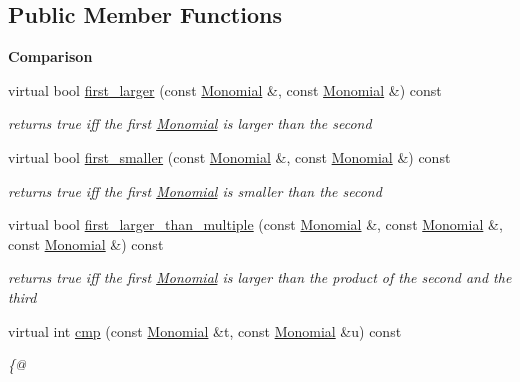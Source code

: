 \subsection*{Public Member Functions}
\begin{Indent}\textbf{ Comparison}\par
\begin{DoxyCompactItemize}
\item 
\mbox{\label{class_generic___grevlex_ab34a4b1def40fd943db4293ddf09c7c5}} 
virtual bool \hyperlink{class_generic___grevlex_ab34a4b1def40fd943db4293ddf09c7c5}{first\+\_\+larger} (const \hyperlink{class_monomial}{Monomial} \&, const \hyperlink{class_monomial}{Monomial} \&) const
\begin{DoxyCompactList}\small\item\em returns {\ttfamily true} iff the first \hyperlink{class_monomial}{Monomial} is larger than the second \end{DoxyCompactList}\item 
\mbox{\label{class_generic___grevlex_a66a1f09fffbdb319fd130941880c7848}} 
virtual bool \hyperlink{class_generic___grevlex_a66a1f09fffbdb319fd130941880c7848}{first\+\_\+smaller} (const \hyperlink{class_monomial}{Monomial} \&, const \hyperlink{class_monomial}{Monomial} \&) const
\begin{DoxyCompactList}\small\item\em returns {\ttfamily true} iff the first \hyperlink{class_monomial}{Monomial} is smaller than the second \end{DoxyCompactList}\item 
\mbox{\label{class_generic___grevlex_a93cb33a7a2f73152ec1e01d155ad14c9}} 
virtual bool \hyperlink{class_generic___grevlex_a93cb33a7a2f73152ec1e01d155ad14c9}{first\+\_\+larger\+\_\+than\+\_\+multiple} (const \hyperlink{class_monomial}{Monomial} \&, const \hyperlink{class_monomial}{Monomial} \&, const \hyperlink{class_monomial}{Monomial} \&) const
\begin{DoxyCompactList}\small\item\em returns {\ttfamily true} iff the first \hyperlink{class_monomial}{Monomial} is larger than the product of the second and the third \end{DoxyCompactList}\item 
virtual int \hyperlink{class_generic___grevlex_afb101ce92463ca2fef409237d005bd87}{cmp} (const \hyperlink{class_monomial}{Monomial} \&t, const \hyperlink{class_monomial}{Monomial} \&u) const
\begin{DoxyCompactList}\small\item\em \{@ \end{DoxyCompactList}\end{DoxyCompactItemize}
\end{Indent}


